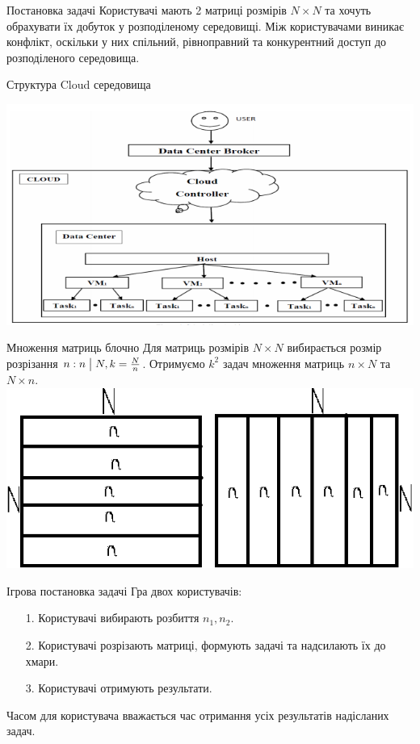 \begin{frame}{Постановка задачі}
	\manimate
	Користувачі мають 2 матриці розмірів $N \times N$ та хочуть обрахувати їх добуток у розподіленому середовищі.
	Між користувачами виникає конфлікт, оскільки у них спільний, рівноправний та конкурентний доступ до розподіленого середовища. 
\end{frame}

\begin{frame}{Структура Cloud середовища}
	\manimate
	
	\includegraphics[width=1.0\linewidth]{im/cloud_representation}
\end{frame}

\begin{frame}{Множення матриць блочно}
	\manimate
	Для матриць розмірів $N \times N$ вибирається розмір розрізання $n: n \bigm| N, k = \frac{N}{n}$. Отримуємо $k^2$ задач множення матриць $n \times N$ та $N \times n$.
	\includegraphics[width=0.8\linewidth]{im/matrixmatrix}
\end{frame}

\begin{frame}{Ігрова постановка задачі}
\manimate
	Гра двох користувачів:
	\begin{itemize}
		\item[1.] Користувачі вибирають розбиття $n_1, n_2$.
		\item[2.] Користувачі розрізають матриці, формують задачі та надсилають їх до хмари.
		\item[3.] Користувачі отримують результати.
	\end{itemize}
	Часом для користувача вважається час отримання усіх результатів надісланих задач.
\end{frame}

